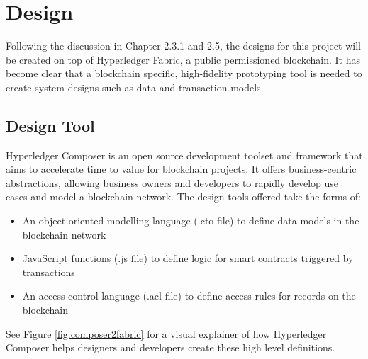 \chapter{Design}
\graphicspath{{Chapter5/Figs/Raster/}{Chapter5/Figs/Tex/}{Chapter5/Figs/}}

Following the discussion in Chapter 2.3.1 and 2.5, the designs for this project 
will be created on top of Hyperledger Fabric, a public permissioned blockchain.
It has become clear that a blockchain specific, high-fidelity prototyping tool is needed 
to create system designs such as data and transaction models.

\section{Design Tool}

Hyperledger Composer is an open source development toolset and framework that aims to 
accelerate time to value for blockchain projects. It offers business-centric 
abstractions, allowing business owners and developers to rapidly develop 
use cases and model a blockchain network. The design tools offered take the forms of:
\begin{itemize}
    \setlength\itemsep{0em}            
    \item An object-oriented modelling language (.cto file) to define data models in 
    the blockchain network
    \item JavaScript functions (.js file) to define logic for smart contracts triggered by transactions
    \item An access control language (.acl file) to define access rules for records on the blockchain\\
    \citep{official2018composer}
\end{itemize}

See Figure \ref{fig:composer2fabric} for a visual explainer of how Hyperledger Composer 
helps designers and developers create these high level definitions.

